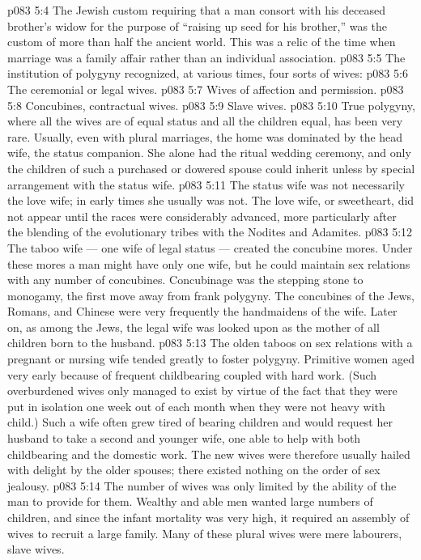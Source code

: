 \vs p083 5:4 The Jewish custom requiring that a man consort with his deceased brother’s widow for the purpose of “raising up seed for his brother,” was the custom of more than half the ancient world. This was a relic of the time when marriage was a family affair rather than an individual association.
\vs p083 5:5 The institution of polygyny recognized, at various times, four sorts of wives:
\vs p083 5:6 \bibnobreakspace The ceremonial or legal wives.
\vs p083 5:7 \bibnobreakspace Wives of affection and permission.
\vs p083 5:8 \bibnobreakspace Concubines, contractual wives.
\vs p083 5:9 \bibnobreakspace Slave wives.
\vs p083 5:10 \pc True polygyny, where all the wives are of equal status and all the children equal, has been very rare. Usually, even with plural marriages, the home was dominated by the head wife, the status companion. She alone had the ritual wedding ceremony, and only the children of such a purchased or dowered spouse could inherit unless by special arrangement with the status wife.
\vs p083 5:11 The status wife was not necessarily the love wife; in early times she usually was not. The love wife, or sweetheart, did not appear until the races were considerably advanced, more particularly after the blending of the evolutionary tribes with the Nodites and Adamites.
\vs p083 5:12 The taboo wife --- one wife of legal status --- created the concubine mores. Under these mores a man might have only one wife, but he could maintain sex relations with any number of concubines. Concubinage was the stepping stone to monogamy, the first move away from frank polygyny. The concubines of the Jews, Romans, and Chinese were very frequently the handmaidens of the wife. Later on, as among the Jews, the legal wife was looked upon as the mother of all children born to the husband.
\vs p083 5:13 The olden taboos on sex relations with a pregnant or nursing wife tended greatly to foster polygyny. Primitive women aged very early because of frequent childbearing coupled with hard work. (Such overburdened wives only managed to exist by virtue of the fact that they were put in isolation one week out of each month when they were not heavy with child.) Such a wife often grew tired of bearing children and would request her husband to take a second and younger wife, one able to help with both childbearing and the domestic work. The new wives were therefore usually hailed with delight by the older spouses; there existed nothing on the order of sex jealousy.
\vs p083 5:14 The number of wives was only limited by the ability of the man to provide for them. Wealthy and able men wanted large numbers of children, and since the infant mortality was very high, it required an assembly of wives to recruit a large family. Many of these plural wives were mere labourers, slave wives.
